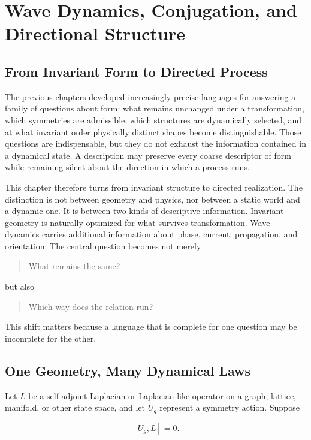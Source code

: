 \chapter{Wave Dynamics, Conjugation, and Directional Structure}

\section{From Invariant Form to Directed Process}

The previous chapters developed increasingly precise languages for answering a family of questions about form: what remains unchanged under a transformation, which symmetries are admissible, which structures are dynamically selected, and at what invariant order physically distinct shapes become distinguishable. Those questions are indispensable, but they do not exhaust the information contained in a dynamical state. A description may preserve every coarse descriptor of form while remaining silent about the direction in which a process runs.

This chapter therefore turns from invariant structure to directed realization. The distinction is not between geometry and physics, nor between a static world and a dynamic one. It is between two kinds of descriptive information. Invariant geometry is naturally optimized for what survives transformation. Wave dynamics carries additional information about phase, current, propagation, and orientation. The central question becomes not merely

\begin{quote}
What remains the same?
\end{quote}

but also

\begin{quote}
Which way does the relation run?
\end{quote}

This shift matters because a language that is complete for one question may be incomplete for the other.

\section{One Geometry, Many Dynamical Laws}

Let $L$ be a self-adjoint Laplacian or Laplacian-like operator on a graph, lattice, manifold, or other state space, and let $U_g$ represent a symmetry action. Suppose

\[
[U_g,L]=0.
\]

